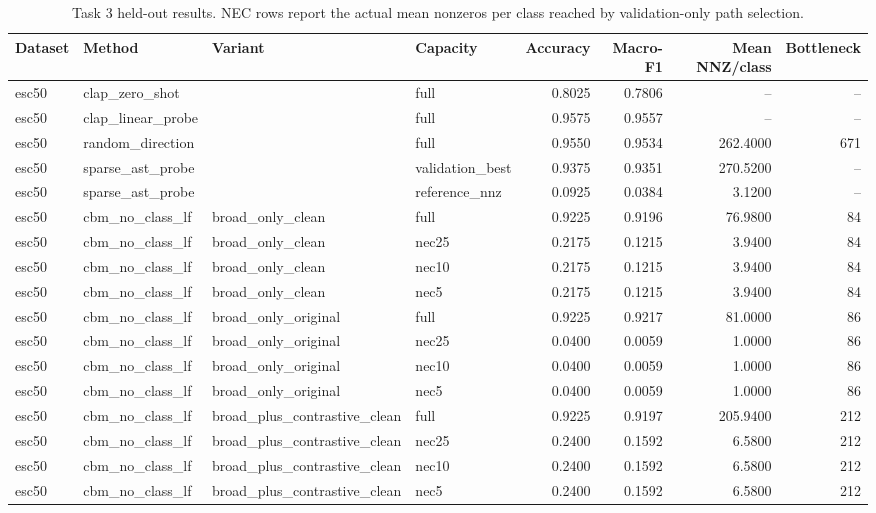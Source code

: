 \begin{table}[t]
\centering
\scriptsize
\caption{Task 3 held-out results. NEC rows report the actual mean nonzeros per class reached by validation-only path selection.}
\label{tab:task3-baselines}
\begin{tabular}{llllrrrr}
\toprule
Dataset & Method & Variant & Capacity & Accuracy & Macro-F1 & Mean NNZ/class & Bottleneck \\
\midrule
esc50 & clap\_zero\_shot &  & full & 0.8025 & 0.7806 & -- & -- \\
esc50 & clap\_linear\_probe &  & full & 0.9575 & 0.9557 & -- & -- \\
esc50 & random\_direction &  & full & 0.9550 & 0.9534 & 262.4000 & 671 \\
esc50 & sparse\_ast\_probe &  & validation\_best & 0.9375 & 0.9351 & 270.5200 & -- \\
esc50 & sparse\_ast\_probe &  & reference\_nnz & 0.0925 & 0.0384 & 3.1200 & -- \\
esc50 & cbm\_no\_class\_lf & broad\_only\_clean & full & 0.9225 & 0.9196 & 76.9800 & 84 \\
esc50 & cbm\_no\_class\_lf & broad\_only\_clean & nec25 & 0.2175 & 0.1215 & 3.9400 & 84 \\
esc50 & cbm\_no\_class\_lf & broad\_only\_clean & nec10 & 0.2175 & 0.1215 & 3.9400 & 84 \\
esc50 & cbm\_no\_class\_lf & broad\_only\_clean & nec5 & 0.2175 & 0.1215 & 3.9400 & 84 \\
esc50 & cbm\_no\_class\_lf & broad\_only\_original & full & 0.9225 & 0.9217 & 81.0000 & 86 \\
esc50 & cbm\_no\_class\_lf & broad\_only\_original & nec25 & 0.0400 & 0.0059 & 1.0000 & 86 \\
esc50 & cbm\_no\_class\_lf & broad\_only\_original & nec10 & 0.0400 & 0.0059 & 1.0000 & 86 \\
esc50 & cbm\_no\_class\_lf & broad\_only\_original & nec5 & 0.0400 & 0.0059 & 1.0000 & 86 \\
esc50 & cbm\_no\_class\_lf & broad\_plus\_contrastive\_clean & full & 0.9225 & 0.9197 & 205.9400 & 212 \\
esc50 & cbm\_no\_class\_lf & broad\_plus\_contrastive\_clean & nec25 & 0.2400 & 0.1592 & 6.5800 & 212 \\
esc50 & cbm\_no\_class\_lf & broad\_plus\_contrastive\_clean & nec10 & 0.2400 & 0.1592 & 6.5800 & 212 \\
esc50 & cbm\_no\_class\_lf & broad\_plus\_contrastive\_clean & nec5 & 0.2400 & 0.1592 & 6.5800 & 212 \\

\end{tabular}
\end{table}
